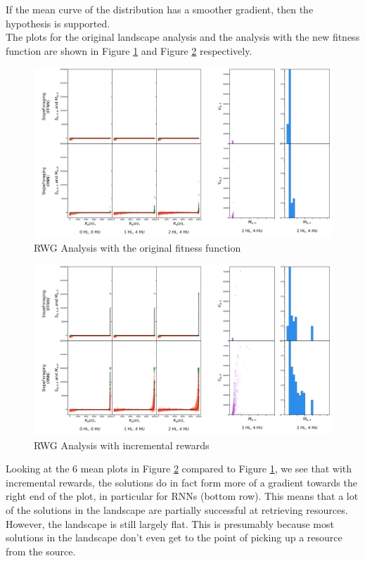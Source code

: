\documentclass[12pt]{article}
\begin{document}
If the mean curve of the distribution has a smoother gradient, then the hypothesis is supported.\\

The plots for the original landscape analysis and the analysis with the new fitness function are shown in Figure \ref{fig:sparse} and Figure \ref{fig:incremental} respectively.\\

\begin{figure}[h]
\centering
\includegraphics[width=1.0\textwidth]{sparse_rewards.png}
\caption{RWG Analysis with the original fitness function}
\label{fig:sparse}
\end{figure}

\begin{figure}[h]
\centering
\includegraphics[width=1.0\textwidth]{incremental_rewards.png}
\caption{RWG Analysis with incremental rewards}
\label{fig:incremental}
\end{figure}

Looking at the 6 mean plots in Figure \ref{fig:incremental} compared to Figure \ref{fig:sparse}, we see that with incremental rewards, the solutions do in fact form more of a gradient towards the right end of the plot, in particular for RNNs (bottom row). 
This means that a lot of the solutions in the landscape are partially successful at retrieving resources. 
However, the landscape is still largely flat. 
This is presumably because most solutions in the landscape don't even get to the point of picking up a resource from the source.\\ 
\end{document}
